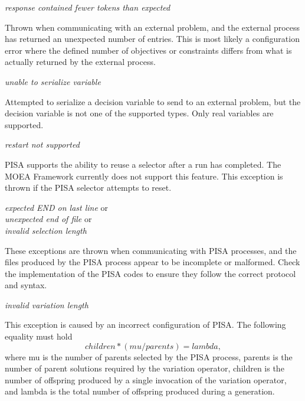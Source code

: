 \noindent
\textit{response contained fewer tokens than expected}
\begin{indented}
  Thrown when communicating with an external problem, and the external process has returned an unexpected number of entries.  This is most likely a configuration error where the defined number of objectives or constraints differs from what is actually returned by the external process.
\end{indented}

\noindent
\textit{unable to serialize variable}
\begin{indented}
  Attempted to serialize a decision variable to send to an external problem, but the decision variable is not one of the supported types.  Only real variables are supported.
\end{indented}

\noindent
\textit{restart not supported}
\begin{indented}
  PISA supports the ability to reuse a selector after a run has completed. The MOEA Framework currently does not support this feature.  This exception is thrown if the PISA selector attempts to reset.
\end{indented}

\noindent
\textit{expected END on last line} or\\
\textit{unexpected end of file} or\\
\textit{invalid selection length}
\begin{indented}
  These exceptions are thrown when communicating with PISA processes, and the files produced by the PISA process appear to be incomplete or malformed. Check the implementation of the PISA codes to ensure they follow the correct protocol and syntax.
\end{indented}

\noindent
\textit{invalid variation length}
\begin{indented}
  This exception is caused by an incorrect configuration of PISA.  The following equality must hold
  \begin{equation*}
    children * (mu / parents) = lambda,
  \end{equation*}
  where mu is the number of parents selected by the PISA process, parents is the number of parent solutions required by the variation operator, children is the number of offspring produced by a single invocation of the variation operator, and lambda is the total number of offspring produced during a generation.
\end{indented}


